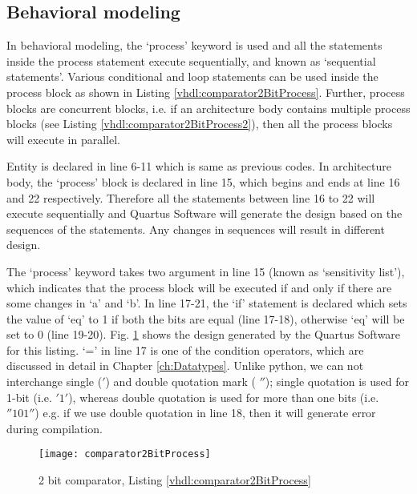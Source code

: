 \subsection{Behavioral modeling}\label{sec:behaviourModeling}
In behavioral modeling, the `process' keyword is used and all the statements inside the process statement execute sequentially, and known as `sequential statements'. Various conditional and loop statements can be used inside the process block as shown in Listing \ref{vhdl:comparator2BitProcess}. Further, process blocks are concurrent blocks, i.e. if an architecture body contains multiple process blocks (see Listing \ref{vhdl:comparator2BitProcess2}), then all the process blocks will execute in parallel. 

\begin{explanation}
	Entity is declared in line 6-11 which is same as previous codes. In architecture body, the `process' block is declared in line 15, which begins and ends at line 16 and 22 respectively. Therefore all the statements between line 16 to 22 will execute sequentially and Quartus Software will generate the design based on the sequences of the statements.  Any changes in sequences will result in different design.
	
	The `process' keyword takes two argument in line 15 (known as `sensitivity list'), which indicates that the process block will be executed if and only if there are some changes in `a' and `b'. In line 17-21, the `if' statement is declared which sets the value of `eq' to 1 if both the bits are equal (line 17-18), otherwise `eq' will be set to 0 (line 19-20). Fig. \ref{fig:comparator2BitProcess} shows the design generated by the Quartus Software for this listing. `=' in line 17 is one of the condition operators, which are discussed in detail in Chapter \ref{ch:Datatypes}. Unlike python, we can not interchange single ($'$) and double quotation mark ( $''$); single quotation is used for 1-bit (i.e. $'1'$), whereas double quotation is used for more than one bits (i.e. $ ''101''$) e.g. if we use double quotation in line 18, then it will generate error during compilation.    
\end{explanation}

\begin{figure}
	\centering
	\texttt{[image: comparator2BitProcess]}
	\caption{2 bit comparator, Listing \ref{vhdl:comparator2BitProcess}}
	\label{fig:comparator2BitProcess}
\end{figure}



